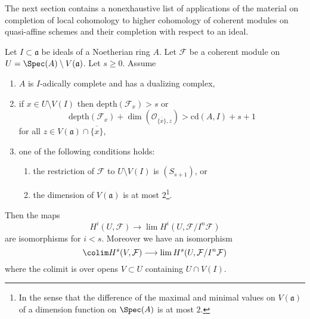 \noindent
The next section contains a nonexhaustive list of
applications of the material
on completion of local cohomology to higher cohomology
of coherent modules on quasi-affine schemes and their
completion with respect to an ideal.

\begin{proposition}
\label{proposition-application-higher}
Let $I \subset \mathfrak a$ be ideals of a Noetherian ring $A$.
Let $\mathcal{F}$ be a coherent module on
$U = \Spec(A) \setminus V(\mathfrak a)$.
Let $s \geq 0$.
Assume
\begin{enumerate}
\item $A$ is $I$-adically complete and has a dualizing complex,
\item if $x \in U \setminus V(I)$ then
$\text{depth}(\mathcal{F}_x) > s$ or
$$
\text{depth}(\mathcal{F}_x) +
\dim(\mathcal{O}_{\overline{\{x\}}, z}) > \text{cd}(A, I) + s + 1
$$
for all $z \in V(\mathfrak a) \cap \overline{\{x\}}$,
\item one of the following conditions holds:
\begin{enumerate}
\item the restriction of $\mathcal{F}$ to $U \setminus V(I)$
is $(S_{s + 1})$, or
\item the dimension of $V(\mathfrak a)$ is at most $2$\footnote{In
the sense that the difference of the maximal and minimal values
on $V(\mathfrak a)$ of a dimension function on $\Spec(A)$ is at most $2$.}.
\end{enumerate}
\end{enumerate}
Then the maps
$$
H^i(U, \mathcal{F})
\longrightarrow
\lim H^i(U, \mathcal{F}/I^n\mathcal{F})
$$
are isomorphisms for $i < s$. Moreover we have an isomorphism
$$
\colim H^s(V, \mathcal{F})
\longrightarrow
\lim H^s(U, \mathcal{F}/I^n\mathcal{F})
$$
where the colimit is over opens $V \subset U$ containing $U \cap V(I)$.
\end{proposition}

